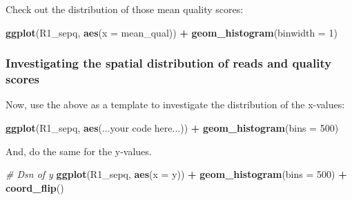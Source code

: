\documentclass[]{krantz}
\makeatletter
\newenvironment{Shaded}{\begin{snugshade}}{\end{snugshade}}
\newcommand{\CommentTok}[1]{\textcolor[rgb]{0.37,0.37,0.37}{\textit{#1}}}
\newcommand{\ControlFlowTok}[1]{\textcolor[rgb]{0.27,0.27,0.27}{\textbf{#1}}}
\newcommand{\DataTypeTok}[1]{\textcolor[rgb]{0.27,0.27,0.27}{#1}}
\newcommand{\DecValTok}[1]{\textcolor[rgb]{0.06,0.06,0.06}{#1}}
\newcommand{\KeywordTok}[1]{\textcolor[rgb]{0.27,0.27,0.27}{\textbf{#1}}}
\newcommand{\NormalTok}[1]{#1}
\newcommand{\OperatorTok}[1]{\textcolor[rgb]{0.43,0.43,0.43}{\textbf{#1}}}
\newcommand{\StringTok}[1]{\textcolor[rgb]{0.5,0.5,0.5}{#1}}
\newenvironment{kframe}{%
\medskip{}
\setlength{\fboxsep}{.8em}
 \def\at@end@of@kframe{}%
 \ifinner\ifhmode%
  \def\at@end@of@kframe{\end{minipage}}%
  \begin{minipage}{\columnwidth}%
 \fi\fi%
 \def\FrameCommand##1{\hskip\@totalleftmargin \hskip-\fboxsep
 \colorbox{shadecolor}{##1}\hskip-\fboxsep
     \hskip-\linewidth \hskip-\@totalleftmargin \hskip\columnwidth}%
 \MakeFramed {\advance\hsize-\width
   \@totalleftmargin\z@ \linewidth\hsize
   \@setminipage}}%
 {\par\unskip\endMakeFramed%
 \at@end@of@kframe}
\renewenvironment{Shaded}{\begin{kframe}}{\end{kframe}}
\makeatother
\begin{document}
\begin{Shaded}
\end{Shaded}

Check out the distribution of those mean quality scores:

\begin{Shaded}
\begin{Highlighting}[]
\KeywordTok{ggplot}\NormalTok{(R1_sepq, }\KeywordTok{aes}\NormalTok{(}\DataTypeTok{x =}\NormalTok{ mean_qual)) }\OperatorTok{+}
\StringTok{  }\KeywordTok{geom_histogram}\NormalTok{(}\DataTypeTok{binwidth =} \DecValTok{1}\NormalTok{)}
\end{Highlighting}
\end{Shaded}

\hypertarget{investigating-the-spatial-distribution-of-reads-and-quality-scores}{%
\subsubsection{Investigating the spatial distribution of reads and quality scores}\label{investigating-the-spatial-distribution-of-reads-and-quality-scores}}

Now, use the above as a template to investigate the distribution of the
x-values:

\begin{Shaded}
\begin{Highlighting}[]
\KeywordTok{ggplot}\NormalTok{(R1_sepq, }\KeywordTok{aes}\NormalTok{(...your code here...)) }\OperatorTok{+}
\StringTok{  }\KeywordTok{geom_histogram}\NormalTok{(}\DataTypeTok{bins =} \DecValTok{500}\NormalTok{)}
\end{Highlighting}
\end{Shaded}

And, do the same for the y-values.

\begin{Shaded}
\begin{Highlighting}[]
\CommentTok{# Dsn of y}
\KeywordTok{ggplot}\NormalTok{(R1_sepq, }\KeywordTok{aes}\NormalTok{(}\DataTypeTok{x =}\NormalTok{ y)) }\OperatorTok{+}
\StringTok{  }\KeywordTok{geom_histogram}\NormalTok{(}\DataTypeTok{bins =} \DecValTok{500}\NormalTok{) }\OperatorTok{+}
\StringTok{  }\KeywordTok{coord_flip}\NormalTok{()}
\end{Highlighting}
\end{Shaded}
\end{document}
